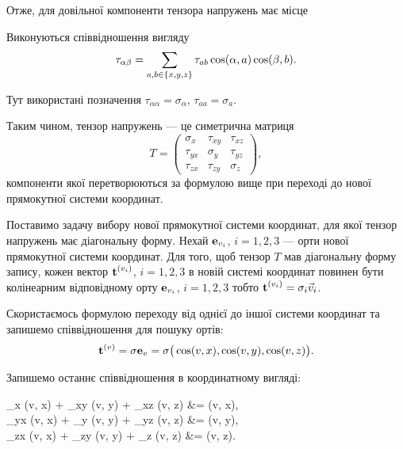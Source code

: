 Отже, для довільної компоненти тензора напружень має місце 
\begin{th_formula*}
	Виконуються співвідношення вигляду
	\begin{equation}
		\tau_{\alpha \beta} = \Sum_{a, b \in \{x, y, z\}} \tau_{a b} \cos (\alpha, a) \cos (\beta, b).
	\end{equation}
\end{th_formula*}

\begin{remark}
	Тут використані позначення $\tau_{\alpha \alpha} = \sigma_\alpha$, $\tau_{a a} = \sigma_a$.
\end{remark}

Таким чином, тензор напружень --- це симетрична матриця
\begin{equation}
	T = 
	\begin{pmatrix}
		\sigma_x & \tau_{xy} & \tau_{xz} \\
		\tau_{yx} & \sigma_y & \tau_{yz} \\
		\tau_{zx} & \tau_{zy} & \sigma_z
	\end{pmatrix},
\end{equation}
компоненти якої перетворюються за формулою вище при переході до нової прямокутної системи координат. \medskip

Поставимо задачу вибору нової прямокутної системи координат, для якої тензор напружень має діагональну форму. Нехай $\bf{e}_{v_i}$, $i = 1, 2, 3$ --- орти нової прямокутної системи координат. Для того, щоб тензор $T$ мав діагональну форму запису, кожен вектор $\bf{t}^{(v_i)}$, $i = 1, 2, 3$ в новій системі координат повинен бути колінеарним відповідному орту $\bf{e}_{v_i}$, $i = 1, 2, 3$ тобто $\bf{t}^{(v_i)} = \sigma_i \vec v_i$. \medskip

Скористаємось формулою переходу від однієї до іншої системи координат та запишемо співвідношення для пошуку ортів:
\begin{equation}
	\bf{t}^{(v)} = \sigma \bf{e}_v = \sigma \big( \cos(v, x), \cos (v, y), \cos (v, z) \big).
\end{equation}

Запишемо останнє співвідношення в координатному вигляді:
\begin{system}
	\sigma_x \cos(v, x) + \tau_{xy} \cos(v, y) + \tau_{xz} \cos(v, z) &= \sigma \cos(v, x), \\
	\tau_{yx} \cos(v, x) + \sigma_y \cos(v, y) + \tau_{yz} \cos(v, z) &= \sigma \cos(v, y), \\
	\tau_{zx} \cos(v, x) + \tau_{zy} \cos(v, y) + \sigma_z \cos(v, z) &= \sigma \cos(v, z).
\end{system}

